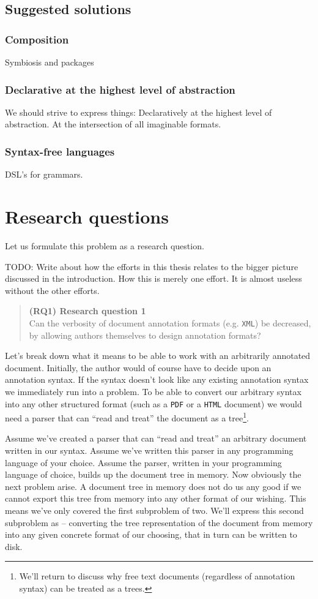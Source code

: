 \documentclass{scrreprt}
\newcommand\researchquestionformat[1]{\begin{quote}#1\end{quote}}
\newcommand\firstresearchquestion{\researchquestionformat{%
  \textbf{(RQ1) Research question 1} \\
  Can the verbosity of document annotation formats (e.g. \texttt{XML}) be decreased, by allowing authors themselves to design annotation formats?%
}}
\begin{document}
\section{Suggested solutions}
\subsection{Composition}
Symbiosis and packages
\subsection{Declarative at the highest level of abstraction}
We should strive to express things: Declaratively at the highest level of abstraction. At the intersection of all imaginable formats.
\subsection{Syntax-free languages}
DSL's for grammars.










\chapter{Research questions}
Let us formulate this problem as a research question.

TODO: Write about how the efforts in this thesis relates to the bigger picture discussed in the introduction. How this is merely one effort. It is almost useless without the other efforts.

\firstresearchquestion

Let's break down what it means to be able to work with an arbitrarily annotated document. Initially, the author would of course have to decide upon an annotation syntax. If the syntax doesn't look like any existing annotation syntax we immediately run into a problem. To be able to convert our arbitrary syntax into any other structured format (such as a \texttt{PDF} or a \texttt{HTML} document) we would need a parser that can ``read and treat'' the document as a tree\footnote{ We'll return to discuss why free text documents (regardless of annotation syntax) can be treated as a trees. }. %

Assume we've created a parser that can ``read and treat'' an arbitrary document written in our syntax. Assume we've written this parser in any programming language of your choice. Assume the parser, written in your programming language of choice, builds up the document tree in memory. Now obviously the next problem arise. A document tree in memory does not do us any good if we cannot export this tree from memory into any other format of our wishing. This means we've only covered the first subproblem of two. We'll express this second subproblem as -- converting the tree representation of the document from memory into any given concrete format of our choosing, that in turn can be written to disk.
\end{document}
